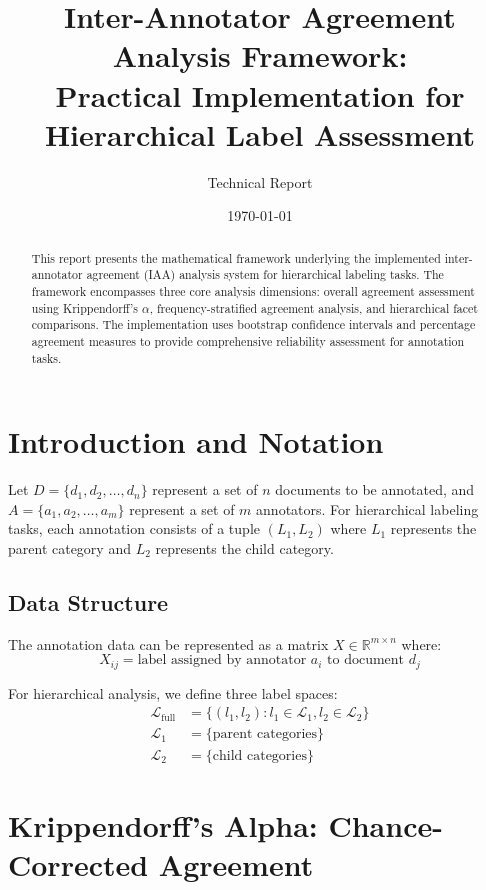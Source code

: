 \documentclass[11pt]{article}
\title{\textbf{Inter-Annotator Agreement Analysis Framework:\\ Practical Implementation for Hierarchical Label Assessment}}
\author{Technical Report}
\date{\today}
\begin{document}
\maketitle

\begin{abstract}
This report presents the mathematical framework underlying the implemented inter-annotator agreement (IAA) analysis system for hierarchical labeling tasks. The framework encompasses three core analysis dimensions: overall agreement assessment using Krippendorff's $\alpha$, frequency-stratified agreement analysis, and hierarchical facet comparisons. The implementation uses bootstrap confidence intervals and percentage agreement measures to provide comprehensive reliability assessment for annotation tasks.
\end{abstract}

\section{Introduction and Notation}

Let $D = \{d_1, d_2, \ldots, d_n\}$ represent a set of $n$ documents to be annotated, and $A = \{a_1, a_2, \ldots, a_m\}$ represent a set of $m$ annotators. For hierarchical labeling tasks, each annotation consists of a tuple $(L_1, L_2)$ where $L_1$ represents the parent category and $L_2$ represents the child category.

\subsection{Data Structure}

The annotation data can be represented as a matrix $X \in \mathbb{R}^{m \times n}$ where:
\begin{equation}
X_{ij} = \text{label assigned by annotator } a_i \text{ to document } d_j
\end{equation}

For hierarchical analysis, we define three label spaces:
\begin{align}
\mathcal{L}_{\text{full}} &= \{(l_1, l_2) : l_1 \in \mathcal{L}_1, l_2 \in \mathcal{L}_2\} \\
\mathcal{L}_1 &= \{\text{parent categories}\} \\
\mathcal{L}_2 &= \{\text{child categories}\}
\end{align}

\section{Krippendorff's Alpha: Chance-Corrected Agreement}
\end{document}
